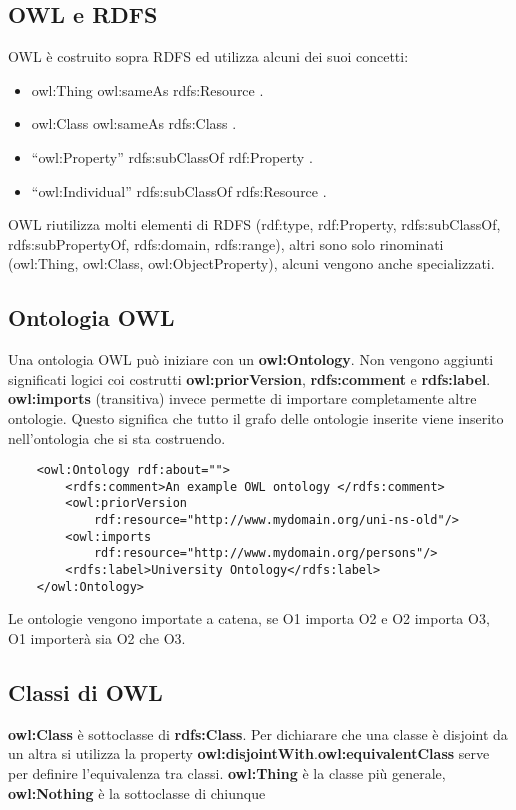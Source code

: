 \subsection{OWL e RDFS}
OWL è costruito sopra RDFS ed utilizza alcuni dei suoi concetti:
\begin{itemize}
	\item owl:Thing owl:sameAs rdfs:Resource .
	\item owl:Class owl:sameAs rdfs:Class .
	\item “owl:Property” rdfs:subClassOf rdf:Property .
	\item “owl:Individual” rdfs:subClassOf rdfs:Resource .
\end{itemize}

OWL riutilizza molti elementi di RDFS (rdf:type, rdf:Property, rdfs:subClassOf, rdfs:subPropertyOf,
rdfs:domain, rdfs:range), altri sono solo rinominati (owl:Thing, owl:Class, owl:ObjectProperty), alcuni vengono anche specializzati.

\subsection{Ontologia OWL}
Una ontologia OWL può iniziare con un \textbf{owl:Ontology}. Non vengono aggiunti significati logici coi costrutti \textbf{owl:priorVersion}, \textbf{rdfs:comment} e \textbf{rdfs:label}. \textbf{owl:imports} (transitiva) invece permette di importare completamente altre ontologie. Questo significa che tutto il grafo delle ontologie inserite viene inserito nell'ontologia che si sta costruendo.

\begin{verbatim}
	<owl:Ontology rdf:about="">
		<rdfs:comment>An example OWL ontology </rdfs:comment>
		<owl:priorVersion
			rdf:resource="http://www.mydomain.org/uni-ns-old"/>
		<owl:imports
			rdf:resource="http://www.mydomain.org/persons"/>
		<rdfs:label>University Ontology</rdfs:label>
	</owl:Ontology>
\end{verbatim}

Le ontologie vengono importate a catena, se O1 importa O2 e O2 importa O3, O1 importerà sia O2 che O3.

\subsection{Classi di OWL}

\textbf{owl:Class} è sottoclasse di \textbf{rdfs:Class}. Per dichiarare che una classe è disjoint da un altra si utilizza la property \textbf{owl:disjointWith}.\textbf{owl:equivalentClass} serve per definire l'equivalenza tra classi. \textbf{owl:Thing} è la classe più generale, \textbf{owl:Nothing} è la sottoclasse di chiunque

